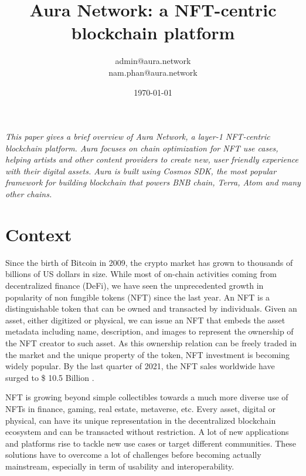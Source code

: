 \documentclass[11pt, titlepage]{article}
\begin{document}
\title{Aura Network: a NFT-centric blockchain platform}
\author{
admin@aura.network\\
nam.phan@aura.network}
\date{\today}
\maketitle

\tableofcontents
\newpage

\textit{
This paper gives a brief overview of \emph{Aura Network}, a layer-1 NFT-centric blockchain platform. Aura focuses on chain optimization for NFT use cases, helping artists and other content providers to create new, user friendly experience with their digital assets. Aura is built using Cosmos SDK, the most popular framework for building blockchain that powers BNB chain, Terra, Atom and many other chains.
}

\section{Context}

Since the birth of Bitcoin in 2009, the crypto market has grown to thousands of billions of US dollars in size. While most of on-chain activities coming from decentralized finance (DeFi), we have seen the unprecedented growth in popularity of non fungible tokens (NFT) since the last year. An NFT is a distinguishable token that can be owned and transacted by individuals. 
Given an asset, either digitized or physical, we can issue an NFT that embeds the asset metadata including name, description, and images to represent the ownership of the NFT creator to such asset. As this ownership relation can be freely traded in the market and the unique property of the token, NFT investment is becoming widely popular. By the last quarter of 2021, the NFT sales worldwide have surged to \$ 10.5 Billion \cite{nftsale}. 

NFT is growing beyond simple collectibles towards a much more diverse use of NFTs in finance, gaming, real estate, metaverse, etc. Every asset, digital or physical, can have its unique representation in the decentralized blockchain ecosystem and can be transacted without restriction. A lot of new applications and platforms rise to tackle new use cases or target different communities. These solutions have to overcome a lot of challenges before becoming actually mainstream, especially in term of usability and interoperability. 
\end{document}
